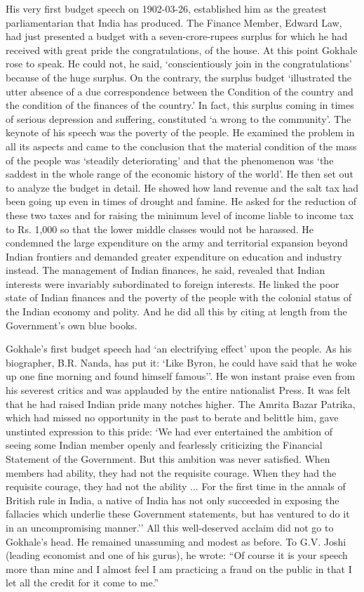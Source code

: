 \begin{multicols}{2}
His very first budget speech on 1902-03-26, established him as the greatest parliamentarian that India has produced. The Finance Member, Edward Law, had just presented a budget with a seven-crore-rupees surplus for which he had received with great pride the congratulations, of the house. At this point Gokhale rose to speak. He could not, he said, `conscientiously join in the congratulations' because of the huge surplus. On the contrary, the surplus budget `illustrated the utter absence of a due correspondence between the Condition of the country and the condition of the finances of the country.' In fact, this surplus coming in times of serious depression and suffering, constituted `a wrong to the community'. The keynote of his speech was the poverty of the people. He examined the problem in all its aspects and came to the conclusion that the material condition of the mass of the people was `steadily deteriorating' and that the phenomenon was `the saddest in the whole range of the economic history of the world'. He then set out to analyze the budget in detail. He showed how land revenue and the salt tax had been going up even in times of drought and famine. He asked for the reduction of these two taxes and for raising the minimum level of income liable to income tax to Rs. 1,000 so that the lower middle classes would not be harassed. He condemned the large expenditure on the army and territorial expansion beyond Indian frontiers and demanded greater expenditure on education and industry instead. The management of Indian finances, he said, revealed that Indian interests were invariably subordinated to foreign interests. He linked the poor state of Indian finances and the poverty of the people with the colonial status of the Indian economy and polity. And he did all this by citing at length from the Government's own blue books.

Gokhale's first budget speech had `an electrifying effect' upon the people. As his biographer, B.R. Nanda, has put it: `Like Byron, he could have said that he woke up one fine morning and found himself famous''. He won instant praise even from his severest critics and was applauded by the entire nationalist Press. It was felt that he had raised Indian pride many notches higher. The Amrita Bazar Patrika, which had missed no opportunity in the past to berate and belittle him, gave unstinted expression to this pride: `We had ever entertained the ambition of seeing some Indian member openly and fearlessly criticizing the Financial Statement of the Government. But this ambition was never satisfied. When members had ability, they had not the requisite courage. When they had the requisite courage, they had not the ability ... For the first time in the annals of British rule in India, a native of India has not only succeeded in exposing the fallacies which underlie these Government statements, but has ventured to do it in an uncompromising manner.'' All this well-deserved acclaim did not go to Gokhale's head. He remained unassuming and modest as before. To G.V. Joshi (leading economist and one of his gurus), he wrote: ``Of course it is your speech more than mine and I almost feel I am practicing a fraud on the public in that I let all the credit for it come to me.''


\end{multicols}
